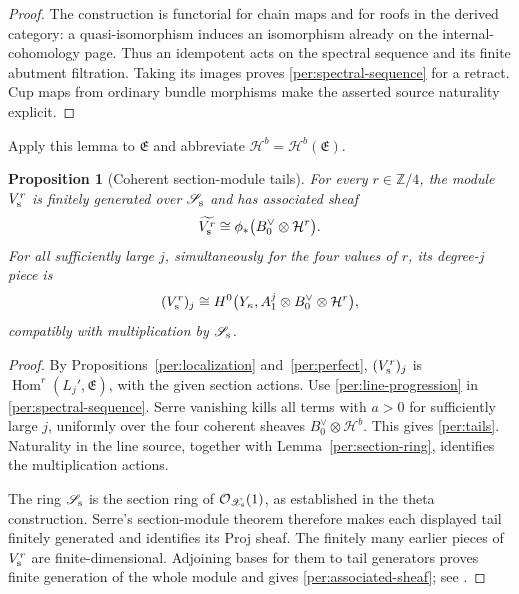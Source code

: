 \documentclass[11pt]{article}
\newtheorem{proposition}[theorem]{Proposition}
\theoremstyle{definition}
\theoremstyle{remark}
\numberwithin{equation}{section}
\begin{document}
\begin{proof}
The construction is functorial for chain maps and for roofs in
the derived category: a quasi-isomorphism induces an isomorphism
already on the internal-cohomology page.  Thus an idempotent acts
on the spectral sequence and its finite abutment filtration.
Taking its images proves \eqref{per:spectral-sequence} for a
retract.  Cup maps from ordinary bundle morphisms make the asserted
source naturality explicit.
\end{proof}

Apply this lemma to $\mathfrak E$ and abbreviate
$\mathcal H^b=\mathcal H^b(\mathfrak E)$.

\begin{proposition}[Coherent section-module tails]
\label{per:finite-generation}
For every $r\in\mathbb Z/4$, the module $V_{\rm s}^r$ is finitely generated
over $\mathscr S_{\rm s}$ and has associated sheaf
\begin{equation}
 \widetilde{V_{\rm s}^r}
   \cong\phi_*\bigl(B_0^\vee\otimes\mathcal H^r\bigr).
 \label{per:associated-sheaf}
\end{equation}
For all sufficiently large $j$, simultaneously for the four values
of $r$, its degree-$j$ piece is
\begin{equation}
 (V_{\rm s}^r)_j
  \cong H^0\bigl(Y_\kappa,
       A_1^j\otimes B_0^\vee\otimes\mathcal H^r\bigr),
 \label{per:tails}
\end{equation}
compatibly with multiplication by $\mathscr S_{\rm s}$.
\end{proposition}

\begin{proof}
By Propositions~\ref{per:localization} and~\ref{per:perfect},
$(V_{\rm s}^r)_j$ is $\operatorname{Hom}^r(L_j',\mathfrak E)$, with the given
section actions.  Use \eqref{per:line-progression} in
\eqref{per:spectral-sequence}.  Serre vanishing kills all terms
with $a>0$ for sufficiently large $j$, uniformly over the four
coherent sheaves $B_0^\vee\otimes\mathcal H^b$.  This gives
\eqref{per:tails}.  Naturality in the line source, together with
Lemma~\ref{per:section-ring}, identifies the multiplication actions.

The ring $\mathscr S_{\rm s}$ is the section ring of
$\mathcal O_{\mathscr X_{\rm s}}(1)$, as established in the theta
construction.  Serre's section-module theorem therefore makes
each displayed tail finitely generated and identifies its Proj
sheaf.  The finitely many earlier pieces of $V_{\rm s}^r$ are
finite-dimensional.  Adjoining bases for them to tail generators
proves finite generation of the whole module and gives
\eqref{per:associated-sheaf}; see \cite{serre-proj}.
\end{proof}
\end{document}
